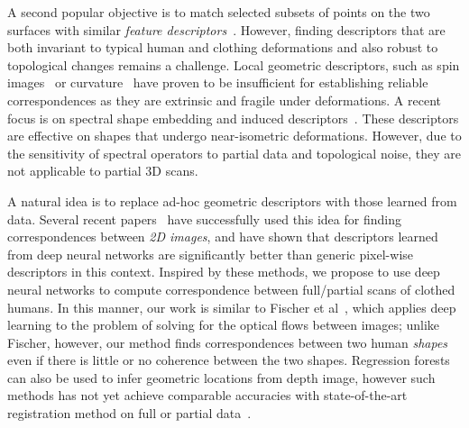 \documentclass[10pt,twocolumn,letterpaper]{article}
\begin{document}
A second popular objective is to match selected subsets of points on the two surfaces with similar \emph{feature descriptors}~\cite{Rustamov:2007,windheus-bmvc14,Litman:2014,aubry-et-al-4dmod11}. However, finding descriptors that are both invariant to typical human and clothing deformations and also robust to topological changes remains a challenge. Local geometric descriptors, such as spin images~\cite{Johnson:1999:USI} or curvature~\cite{journals/cagd/PottmannWHY09} have proven to be insufficient for establishing reliable correspondences as they are extrinsic and fragile under deformations. A recent focus is on spectral shape embedding and induced descriptors~\cite{ conf/smi/JainZ06,Sun:2009:CPI, journals/cgf/OvsjanikovMMG10, aubry-et-al-4dmod11, MasBosBroVan15}. These descriptors are effective on shapes that undergo near-isometric deformations. %
However, due to the sensitivity of spectral operators to partial data and topological noise, they are not applicable to partial 3D scans.

A natural idea is to replace ad-hoc geometric descriptors with those learned from data. Several recent papers~\cite{NIPS2014_5420,Han_2015_CVPR,DBLP:conf/cvpr/ZagoruykoK15,Girshick_2014_CVPR} have successfully used this idea for finding correspondences between \emph{2D images}, and have shown that descriptors learned from deep neural networks are significantly better than generic pixel-wise descriptors in this context. Inspired by these methods, we propose to use deep neural networks to compute correspondence between full/partial scans of clothed humans. In this manner, our work is similar to Fischer et al~\cite{DBLP:journals/corr/FischerDIHHGSCB15}, which applies deep learning to the problem of solving for the optical flows between images; unlike Fischer, however, our method finds correspondences between two human \emph{shapes} even if there is little or no coherence between the two shapes.
Regression forests~\cite{taylor2012vitruvian, ponsmoll15} can also be used to infer geometric locations from depth image, however such methods has not yet achieve comparable accuracies with state-of-the-art registration method on full or partial data~\cite{chen15}.
\end{document}
